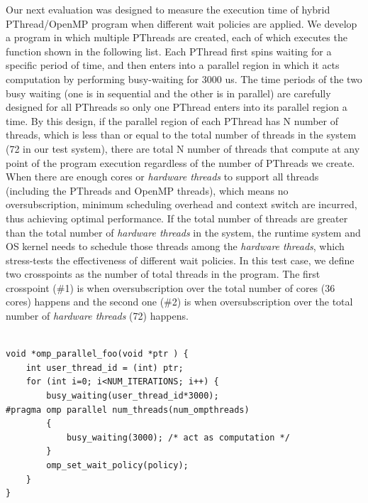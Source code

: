 Our next evaluation was designed to measure the execution time of hybrid PThread/OpenMP program when different
wait policies are applied. We develop a program in which multiple PThreads are created, 
each of which executes the function shown in the following list. 
Each PThread first spins waiting for a specific period of time, and  
then enters into a {\sf parallel} region in which it acts computation by performing busy-waiting for 3000 us.
The time periods of the two busy waiting (one is in sequential and the other is in {\sf parallel}) are carefully designed for
all PThreads so only one PThread enters into its {\sf parallel} region a time. 
By this design, if the {\sf parallel} region of each PThread has N number of threads, which is less than or equal to 
the total number of threads in the system (72 in our test system), there are total N number of threads that compute  
at any point of the program execution regardless of the number of PThreads we create. 
When there are enough cores or {\it hardware threads} to support all threads (including the PThreads and OpenMP threads),
which means no oversubscription, minimum scheduling overhead and context switch are incurred, thus achieving optimal 
performance. If the total number of threads are 
greater than the total number of {\it hardware threads} in the system, the runtime system and OS kernel 
needs to schedule those threads among the {\it hardware threads}, which stress-tests the effectiveness of different wait policies. 
In this test case, we define two crosspoints as the number of total threads in the program. 
The first crosspoint (\#1) is when oversubscription
over the total number of cores (36 cores) happens and the second one (\#2) is when oversubscription
over the total number of {\it hardware threads} (72) happens. 


\lstset{basicstyle=\sffamily\footnotesize,language=c, numbersep=1pt}
\begin{lstlisting}[frame=single]  % Start your code-block

void *omp_parallel_foo(void *ptr ) {   
    int user_thread_id = (int) ptr;
    for (int i=0; i<NUM_ITERATIONS; i++) {
        busy_waiting(user_thread_id*3000);
#pragma omp parallel num_threads(num_ompthreads)
        {   
            busy_waiting(3000); /* act as computation */
        }
        omp_set_wait_policy(policy);
    }
}

\end{lstlisting}


